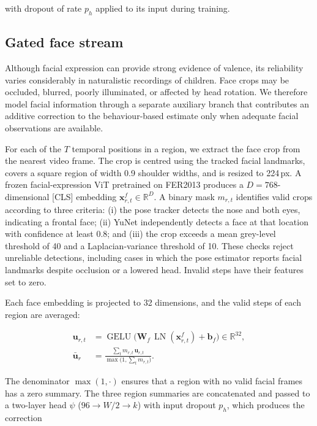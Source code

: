 \documentclass[11pt]{article}
\newcommand{\R}{\mathbb{R}}
\newcommand{\vb}{\mathbf{b}}
\newcommand{\vu}{\mathbf{u}}
\newcommand{\mW}{\mathbf{W}}
\newcommand{\GELU}{\operatorname{GELU}}
\newcommand{\LN}{\operatorname{LN}}
\begin{document}
with dropout of rate $p_h$ applied to its input during training.

\subsection{Gated face stream}
\label{sec:face}

Although facial expression can provide strong evidence of valence, its reliability varies considerably in naturalistic recordings of children. Face crops may be occluded, blurred, poorly illuminated, or affected by head rotation. We therefore model facial information through a separate auxiliary branch that contributes an additive correction to the behaviour-based estimate only when adequate facial observations are available.

For each of the $T$ temporal positions in a region, we extract the face crop from the nearest video frame. The crop is centred using the tracked facial landmarks, covers a square region of width 0.9 shoulder widths, and is resized to 224\,px. A frozen facial-expression ViT pretrained on FER2013 produces a $D=768$-dimensional [CLS] embedding $\mathbf{x}^f_{r,t}\in\R^{D}$. A binary mask $m_{r,t}$ identifies valid crops according to three criteria: (i) the pose tracker detects the nose and both eyes, indicating a frontal face; (ii) YuNet independently detects a face at that location with confidence at least 0.8; and (iii) the crop exceeds a mean grey-level threshold of 40 and a Laplacian-variance threshold of 10. These checks reject unreliable detections, including cases in which the pose estimator reports facial landmarks despite occlusion or a lowered head. Invalid steps have their features set to zero.

Each face embedding is projected to 32 dimensions, and the valid steps of each region are averaged:

\begin{equation}
  \begin{aligned}
    \vu_{r,t} &= \GELU\big(\mW_f\,\LN(\mathbf{x}^f_{r,t})+\vb_f\big)\in\R^{32},\\
    \bar{\vu}_r &= \frac{\sum_{t} m_{r,t}\,\vu_{r,t}}{\max\big(1,\sum_{t} m_{r,t}\big)}.
  \end{aligned}
\end{equation}

The denominator $\max(1,\cdot)$ ensures that a region with no valid facial frames has a zero summary. The three region summaries are concatenated and passed to a two-layer head $\psi$ ($96\to W/2\to k$) with input dropout $p_h$, which produces the correction
\end{document}
